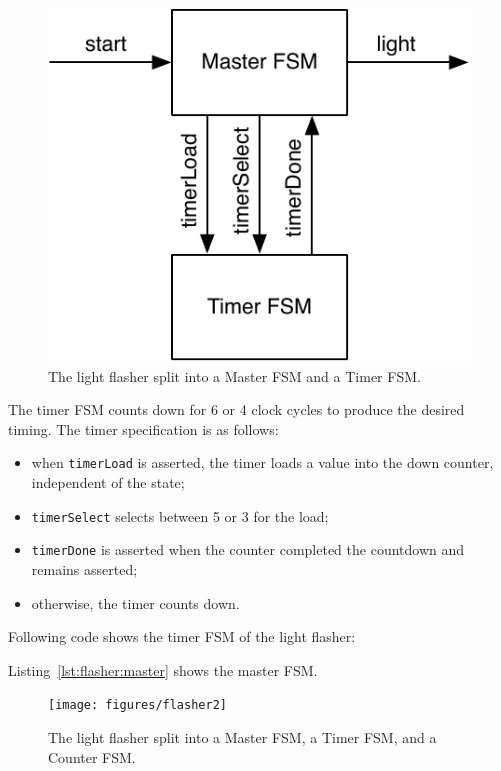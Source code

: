 \documentclass[%
    10pt,
    headinclude, footexclude,
    openright, %
    notitlepage,
    cleardoubleempty,
    headsepline,
    pointlessnumbers,
    bibtotoc, idxtotoc,
    ]{scrbook}
\newcommand{\code}[1]{{\small{\texttt{#1}}}}
\newcommand{\scale}{0.7}
\begin{document}
\begin{figure}
  \centering
  \includegraphics[scale=\scale]{figures/flasher}
  \caption{The light flasher split into a Master FSM and a Timer FSM.}
  \label{fig:flasher}
\end{figure}

The timer FSM counts down for 6 or 4 clock cycles to produce the desired timing.
The timer specification is as follows:

\begin{itemize}
\item when \code{timerLoad} is asserted, the timer loads a value into the down counter,
independent of the state;
\item \code{timerSelect} selects between 5 or 3 for the load;
\item \code{timerDone} is asserted when the counter completed the countdown
and remains asserted;
\item otherwise, the timer counts down.
\end{itemize}

\noindent Following code shows the timer FSM of the light flasher:


\noindent Listing~\ref{lst:flasher:master} shows the master FSM.


\begin{figure}
  \centering
  \texttt{[image: figures/flasher2]}
  \caption{The light flasher split into a Master FSM, a Timer FSM, and a Counter FSM.}
  \label{fig:flasher2}
\end{figure}
\end{document}
